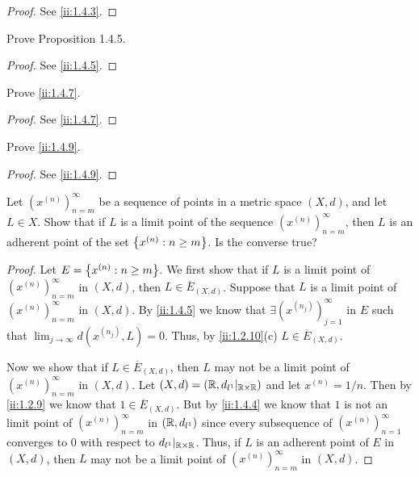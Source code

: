 \begin{proof}
  See \cref{ii:1.4.3}.
\end{proof}

\begin{ex}\label{ii:ex:1.4.2}
  Prove Proposition 1.4.5.
\end{ex}

\begin{proof}
  See \cref{ii:1.4.5}.
\end{proof}

\begin{ex}\label{ii:ex:1.4.3}
  Prove \cref{ii:1.4.7}.
\end{ex}

\begin{proof}
  See \cref{ii:1.4.7}.
\end{proof}

\begin{ex}\label{ii:ex:1.4.4}
  Prove \cref{ii:1.4.9}.
\end{ex}

\begin{proof}
  See \cref{ii:1.4.9}.
\end{proof}

\begin{ex}\label{ii:ex:1.4.5}
  Let \((x^{(n)})_{n = m}^\infty\) be a sequence of points in a metric space \((X, d)\), and let \(L \in X\).
  Show that if \(L\) is a limit point of the sequence \((x^{(n)})_{n = m}^\infty\), then \(L\) is an adherent point of the set \(\left\lbrace x^{(n)} : n \geq m\right\rbrace\).
  Is the converse true?
\end{ex}

\begin{proof}
  Let \(E = \left\lbrace x^{(n)} : n \geq m\right\rbrace\).
  We first show that if \(L\) is a limit point of \((x^{(n)})_{n = m}^\infty\) in \((X, d)\), then \(L \in \overline{E}_{(X, d)}\).
  Suppose that \(L\) is a limit point of \((x^{(n)})_{n = m}^\infty\) in \((X, d)\).
  By \cref{ii:1.4.5} we know that \(\exists (x^{(n_j)})_{j = 1}^\infty\) in \(E\) such that \(\lim_{j \to \infty} d(x^{(n_j)}, L) = 0\).
  Thus, by \cref{ii:1.2.10}(c) \(L \in \overline{E}_{(X, d)}\).

  Now we show that if \(L \in \overline{E}_{(X, d)}\), then \(L\) may not be a limit point of \((x^{(n)})_{n = m}^\infty\) in \((X, d)\).
  Let \((X, d) = (\mathbb{R}, d_{l^1}|_{\mathbb{R} \times \mathbb{R}})\) and let \(x^{(n)} = 1 / n\).
  Then by \cref{ii:1.2.9} we know that \(1 \in \overline{E}_{(X, d)}\).
  But by \cref{ii:1.4.4} we know that \(1\) is not an limit point of \((x^{(n)})_{n = m}^\infty\) in \((\mathbb{R}, d_{l^1})\) since every subsequence of \((x^{(n)})_{n = 1}^\infty\) converges to \(0\) with respect to \(d_{l^1}|_{\mathbb{R} \times \mathbb{R}}\).
  Thus, if \(L\) is an adherent point of \(E\) in \((X, d)\), then \(L\) may not be a limit point of \((x^{(n)})_{n = m}^\infty\) in \((X, d)\).
\end{proof}

